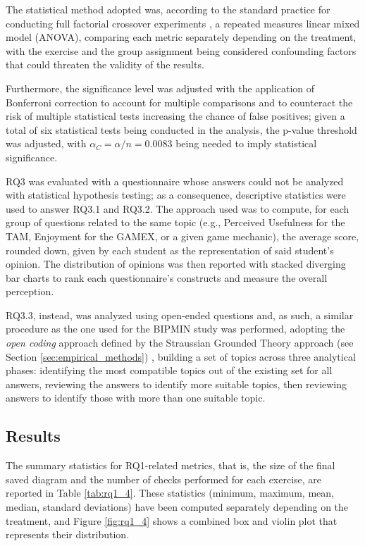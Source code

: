 The statistical method adopted was, according to the standard practice for conducting full factorial crossover experiments \cite{vegas2016crossover}, a repeated measures linear mixed model (ANOVA), comparing each metric separately depending on the treatment, with the exercise and the group assignment being considered confounding factors that could threaten the validity of the results.

Furthermore, the significance level was adjusted with the application of Bonferroni correction to account for multiple comparisons and to counteract the risk of multiple statistical tests increasing the chance of false positives; given a total of six statistical tests being conducted in the analysis, the p-value threshold was adjusted, with $\alpha_C = \alpha / n =  0.0083$ being needed to imply statistical significance. 


RQ3 was evaluated with a questionnaire whose answers could not be analyzed with statistical hypothesis testing; as a consequence, descriptive statistics were used to answer RQ3.1 and RQ3.2. The approach used was to compute, for each group of questions related to the same topic (e.g., Perceived Usefulness for the TAM, Enjoyment for the GAMEX, or a given game mechanic), the average score, rounded down, given by each student as the representation of said student's opinion. The distribution of opinions was then reported with stacked diverging bar charts to rank each questionnaire's constructs and measure the overall perception.

RQ3.3, instead, was analyzed using open-ended questions and, as such, a similar procedure as the one used for the BIPMIN study was performed, adopting the \textit{open coding} approach defined by the Straussian Grounded Theory approach (see Section \ref{sec:empirical_methods}) \cite{strauss1998basics}, building a set of topics across three analytical phases: identifying the most compatible topics out of the existing set for all answers, reviewing the answers to identify more suitable topics, then reviewing answers to identify those with more than one suitable topic.

\subsection{Results}

The summary statistics for RQ1-related metrics, that is, the size of the final saved diagram and the number of checks performed for each exercise, are reported in Table \ref{tab:rq1_4}. These statistics (minimum, maximum, mean, median, standard deviations) have been computed separately depending on the treatment, and Figure \ref{fig:rq1_4} shows a combined box and violin plot that represents their distribution.

